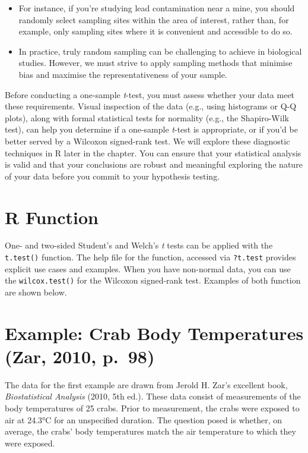 \documentclass[
  letterpaper,
]{book}
\providecommand{\tightlist}{%
  \setlength{\itemsep}{0pt}\setlength{\parskip}{0pt}}\usepackage{longtable,booktabs,array}
\begin{document}
\begin{enumerate}
  \begin{itemize}
  \tightlist
  \item
    For instance, if you're studying lead contamination near a mine, you
    should randomly select sampling sites within the area of interest,
    rather than, for example, only sampling sites where it is convenient
    and accessible to do so.
  \item
    In practice, truly random sampling can be challenging to achieve in
    biological studies. However, we must strive to apply sampling
    methods that minimise bias and maximise the representativeness of
    your sample.
  \end{itemize}
\end{enumerate}

\vspace{6pt}

Before conducting a one-sample \emph{t}-test, you must assess whether
your data meet these requirements. Visual inspection of the data (e.g.,
using histograms or Q-Q plots), along with formal statistical tests for
normality (e.g., the Shapiro-Wilk test), can help you determine if a
one-sample \emph{t}-test is appropriate, or if you'd be better served by
a Wilcoxon signed-rank test. We will explore these diagnostic techniques
in R later in the chapter. You can ensure that your statistical analysis
is valid and that your conclusions are robust and meaningful exploring
the nature of your data before you commit to your hypothesis testing.

\section{R Function}\label{r-function}

One- and two-sided Student's and Welch's \emph{t} tests can be applied
with the \texttt{t.test()} function. The help file for the function,
accessed via \texttt{?t.test} provides explicit use cases and examples.
When you have non-normal data, you can use the \texttt{wilcox.test()}
for the Wilcoxon signed-rank test. Examples of both function are shown
below.

\section{Example: Crab Body Temperatures (Zar, 2010,
p.~98)}\label{example-crab-body-temperatures-zar-2010-p.-98}

The data for the first example are drawn from Jerold H. Zar's excellent
book, \emph{Biostatistical Analysis} (2010, 5th ed.). These data consist
of measurements of the body temperatures of 25 crabs. Prior to
measurement, the crabs were exposed to air at 24.3°C for an unspecified
duration. The question posed is whether, on average, the crabs' body
temperatures match the air temperature to which they were exposed.
\end{document}

